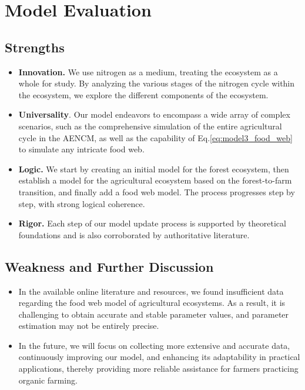 \documentclass{mcmthesis}
\begin{document}
\section{Model Evaluation}
\subsection{Strengths}
\begin{itemize}  
    \item \textbf{Innovation.} We use nitrogen as a medium, treating the ecosystem as a whole for study. By analyzing the various stages of the nitrogen cycle within the ecosystem, we explore the different components of the ecosystem.  
    \item \textbf{Universality}. Our model endeavors to encompass a wide array of complex scenarios, such as the comprehensive simulation of the entire agricultural cycle in the AENCM, as well as the capability of Eq.\ref{eq:model3_food_web} to simulate any intricate food web.
    \item \textbf{Logic.} We start by creating an initial model for the forest ecosystem, then establish a model for the agricultural ecosystem based on the forest-to-farm transition, and finally add a food web model. The process progresses step by step, with strong logical coherence.  
    \item \textbf{Rigor.} Each step of our model update process is supported by theoretical foundations and is also corroborated by authoritative literature. 
\end{itemize}  
\subsection{Weakness and Further Discussion}
\begin{itemize}  
    \item In the available online literature and resources, we found insufficient data regarding the food web model of agricultural ecosystems. As a result, it is challenging to obtain accurate and stable parameter values, and parameter estimation may not be entirely precise.  
    \item In the future, we will focus on collecting more extensive and accurate data, continuously improving our model, and enhancing its adaptability in practical applications, thereby providing more reliable assistance for farmers practicing organic farming.  
\end{itemize}  


\printbibliography
\end{document}
